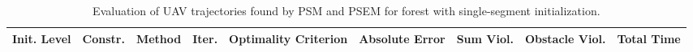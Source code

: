 \begin{table}
\small

\caption{Evaluation of UAV trajectories found by PSM and PSEM for forest with single-segment initialization.}
\label{tab:traj-plan-eval-forest-single}
\begin{tabular}{p{21mm}p{9mm}p{12mm}p{6mm}p{14mm}p{14mm}p{14mm}p{14mm}p{14mm}}
\toprule
Init. Level & Constr. & Method & Iter. & Optimality Criterion & Absolute Error & Sum Viol. & Obstacle Viol. & Total Time \\
\midrule
\bottomrule
\end{tabular}
\end{table}
